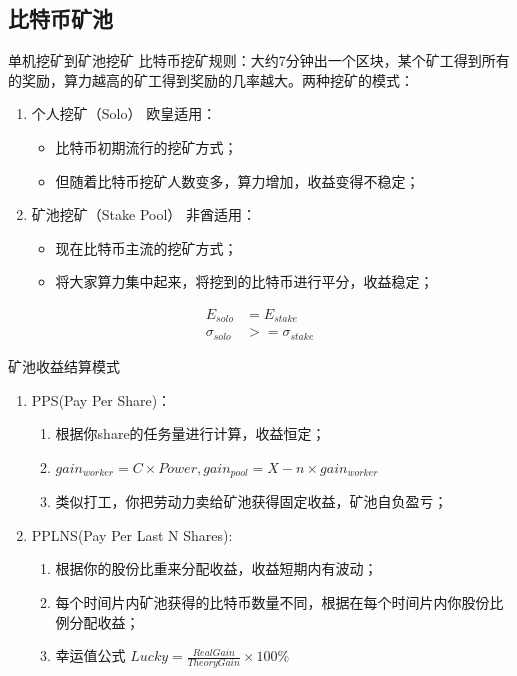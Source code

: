 \documentclass[11pt]{beamer}
\begin{document}
\subsection{比特币矿池}
\begin{frame}{单机挖矿到矿池挖矿}
	比特币挖矿规则：大约7分钟出一个区块，某个矿工得到所有的奖励，算力越高的矿工得到奖励的几率越大。两种挖矿的模式：
	\begin{enumerate}
		\item 个人挖矿（Solo）{\color{red} 欧皇适用}：
			\begin{itemize}
				\item 比特币初期流行的挖矿方式；
				\item 但随着比特币挖矿人数变多，算力增加，收益变得不稳定；
			\end{itemize}
		\item 矿池挖矿（Stake Pool）{\color{red} 非酋适用}：
			\begin{itemize}
				\item 现在比特币主流的挖矿方式；
				\item 将大家算力集中起来，将挖到的比特币进行平分，收益稳定；
			\end{itemize}
	\end{enumerate}
	\begin{align}
		E_{solo}&=E_{stake}\\
	\sigma_{solo}&>=\sigma_{stake}
	\end{align}	
\end{frame}

\begin{frame}{矿池收益结算模式}
	\begin{enumerate}
		\item  PPS(Pay Per Share)：
		\begin{enumerate}
			\item 根据你share的任务量进行计算，{\color{red}收益恒定}；
			\item $gain_{worker}=C\times Power,gain_{pool}=X-n\times gain_{worker}$
			\item 类似打工，你把劳动力卖给矿池获得固定收益，矿池自负盈亏；
		\end{enumerate}
		\item PPLNS(Pay Per Last N Shares):
		\begin{enumerate}
			\item 根据你的股份比重来分配收益，{\color{red}收益短期内有波动}；
			\item 每个时间片内矿池获得的比特币数量不同，根据在每个时间片内你股份比例分配收益；
			\item 幸运值公式 $Lucky = \frac{RealGain}{TheoryGain}\times 100 \%$ 
		\end{enumerate}
	\end{enumerate}
\end{frame}
\end{document}
